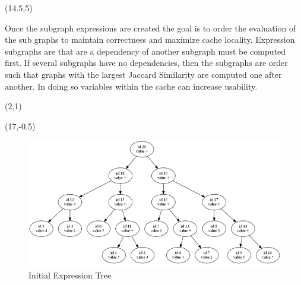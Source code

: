 \documentclass[landscape]{a0poster}
\def\Subhead#1{\noindent{\textbf{\Large\color{DarkBlue} #1}}\medskip}
\begin{document}
\begin{textblock}{30}
\begin{textblock}{14}(14.5,5)
	\Subhead{Rebuilding}%

	\vspace{-0.25in}
	Once the subgraph expressions are created the goal is to order the evaluation of the sub graphs to maintain correctness and maximize cache locality. Expression subgraphs are that are a dependency of another subgraph must be computed first. If several subgraphs have no dependencies, then the subgraphs are order such that graphs with the largest Jaccard Similarity are computed one after another. In doing so variables within the cache can increase usability. 
	\begin{textblock}{12}(2,1)
	\end{textblock}	
\end{textblock}

\begin{textblock}{14}(17,-0.5)
	\begin{figure}
				\includegraphics[scale = 2.1]{tree1_initial.png}
				\caption{\large Initial Expression Tree}
	\end{figure}
\end{textblock}






\end{textblock}
\end{document}
